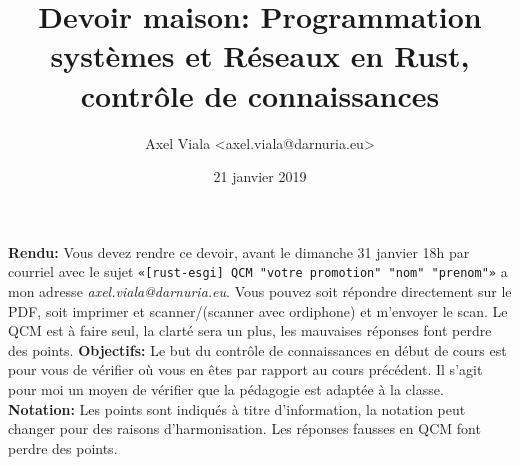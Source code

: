 \documentclass[11pt,a4paper,addpoint,answers]{exam}
\author{Axel Viala <axel.viala@darnuria.eu>}
\title{Devoir maison: Programmation systèmes et Réseaux en Rust, contrôle de connaissances}
\date{21 janvier 2019}
\begin{document}
  \maketitle

  \textbf{Rendu:} Vous devez rendre ce devoir, avant le dimanche 31 janvier 18h par courriel avec le sujet
  \texttt{«[rust-esgi] QCM "votre promotion" "nom" "prenom"»} a mon adresse \emph{axel.viala@darnuria.eu}.
  Vous pouvez soit répondre directement sur le PDF, soit imprimer et scanner/(scanner avec ordiphone) et m'envoyer le scan.
  Le QCM est à faire seul, la clarté sera un plus, les mauvaises réponses font perdre des points.
  \textbf{Objectifs:} Le but du contrôle de connaissances en début de cours est pour vous de vérifier où vous
  en êtes par rapport au cours précédent.
  \newline
  Il s'agit pour moi un moyen de vérifier que la pédagogie est adaptée à la classe.
  \newline
  \textbf{Notation:} Les points sont indiqués à titre d'information, la notation peut changer pour
  des raisons d'harmonisation. Les réponses fausses en QCM font perdre des points.
\end{document}
